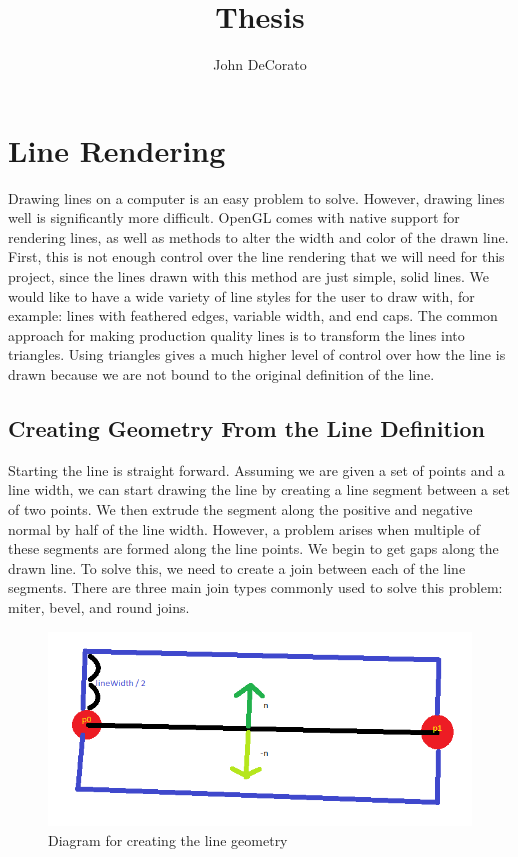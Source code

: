 \documentclass[12pt]{report}
\title{Thesis}
\author{John DeCorato}
\date{ }
\begin{document}
\chapter{Line Rendering}

Drawing lines on a computer is an easy problem to solve. 
However, drawing lines well is significantly more difficult.
OpenGL comes with native support for rendering lines, as well as methods to alter the width and color of the drawn line.
First, this is not enough control over the line rendering that we will need for this project, since the lines drawn with this method are just simple, solid lines.
We would like to have a wide variety of line styles for the user to draw with, for example: lines with feathered edges, variable width, and end caps.
The common approach for making production quality lines is to transform the lines into triangles. 
Using triangles gives a much higher level of control over how the line is drawn because we are not bound to the original definition of the line.

\section{Creating Geometry From the Line Definition}


Starting the line is straight forward. 
Assuming we are given a set of points and a line width, we can start drawing the line by creating a line segment between a set of two points. We then extrude the segment along the positive and negative normal by half of the line width.
However, a problem arises when multiple of these segments are formed along the line points.
We begin to get gaps along the drawn line. 
To solve this, we need to create a join between each of the line segments.
There are three main join types commonly used to solve this problem: miter, bevel, and round joins.

\begin{figure}
	\includegraphics[width=\textwidth]{linesegment1.png}
	\caption{Diagram for creating the line geometry}
\end{figure}
\end{document}
